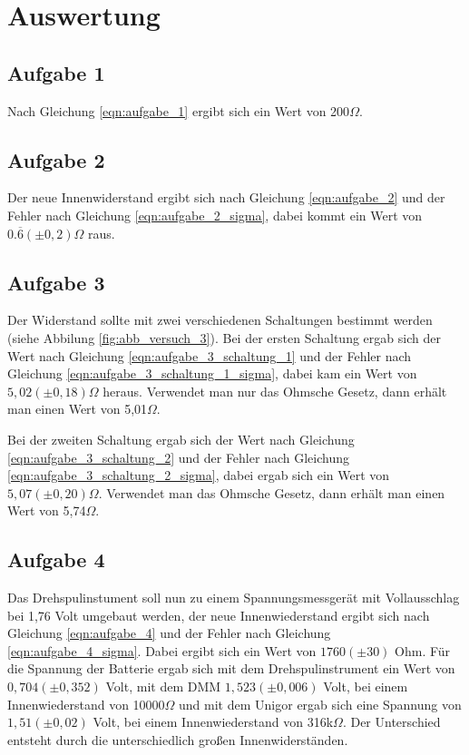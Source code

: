 \documentclass[12pt]{scrartcl}
\begin{document}
\newpage


\section{Auswertung}

\subsection{Aufgabe 1}
Nach Gleichung \ref{eqn:aufgabe_1} ergibt sich ein Wert von 200$\Omega$.

\subsection{Aufgabe 2}
Der neue Innenwiderstand ergibt sich nach Gleichung \ref{eqn:aufgabe_2} und der Fehler nach Gleichung \ref{eqn:aufgabe_2_sigma}, dabei kommt ein Wert von $0.\overline{6}(\pm 0,2)\Omega$ raus.

\subsection{Aufgabe 3}
Der Widerstand sollte mit zwei verschiedenen Schaltungen bestimmt werden (siehe Abbilung \ref{fig:abb_versuch_3}).
Bei der ersten Schaltung ergab sich der Wert nach Gleichung \ref{eqn:aufgabe_3_schaltung_1} und der Fehler nach Gleichung \ref{eqn:aufgabe_3_schaltung_1_sigma}, dabei kam ein Wert von $5,02	(\pm 0,18)\Omega$ heraus.
Verwendet man nur das Ohmsche Gesetz, dann erhält man einen Wert von 5,01$\Omega$.

Bei der zweiten Schaltung ergab sich der Wert nach Gleichung \ref{eqn:aufgabe_3_schaltung_2} und der Fehler nach Gleichung \ref{eqn:aufgabe_3_schaltung_2_sigma}, dabei ergab sich ein Wert von $5,07 (\pm 0,20)\Omega$.
Verwendet man das Ohmsche Gesetz, dann erhält man einen Wert von 5,74$\Omega$.

\subsection{Aufgabe 4}
Das Drehspulinstument soll nun zu einem Spannungsmessgerät mit Vollausschlag bei 1,76 Volt umgebaut werden, der neue Innenwiederstand ergibt sich nach Gleichung \ref{eqn:aufgabe_4} und der Fehler nach Gleichung \ref{eqn:aufgabe_4_sigma}.
Dabei ergibt sich ein Wert von $1760 (\pm 30)$ Ohm.
Für die Spannung der Batterie ergab sich mit dem Drehspulinstrument ein Wert von $0,704 (\pm 0,352)$ Volt, mit dem DMM $1,523 (\pm 0,006)$ Volt, bei einem Innenwiederstand von 10000$\Omega$ und mit dem Unigor ergab sich eine Spannung von $1,51 (\pm 0,02)$ Volt, bei einem Innenwiederstand von 316k$\Omega$.
Der Unterschied entsteht durch die unterschiedlich großen Innenwiderständen.
\end{document}
